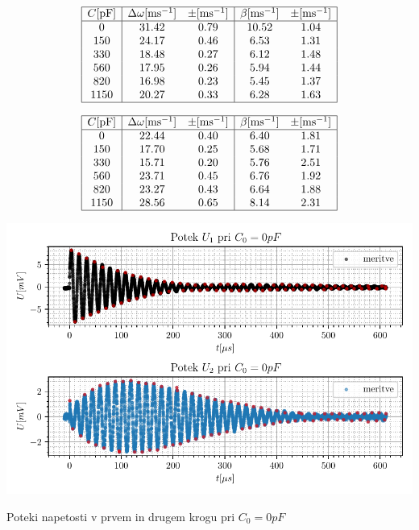 \documentclass[12pt]{report}
\begin{document}
\begin{tabela}
  \centering
  \[
    \begin{array}{|c|c c|c c|}\hline 
      C [\si{pF}] & \Delta \omega [\si{ms^{-1}}] & \pm [\si{ms^{-1}}] & \beta [\si{ms^{-1}}] & \pm [\si{ms^{-1}}]\\ \hline 
      0 & 31.42 &    0.79 &   10.52 &    1.04\\
      150 & 24.17 &    0.46 &    6.53 &    1.31\\
      330 & 18.48 &    0.27 &    6.12 &    1.48\\
      560 & 17.95 &    0.26 &    5.94 &    1.44\\
      820 & 16.98 &    0.23 &    5.45 &    1.37\\
      1150 & 20.27 &    0.33 &    6.28 &    1.63\\ \hline
    \end{array}
  \]
\end{tabela}

\begin{tabela}
  \centering
  \[
    \begin{array}{|c|c c|c c|}\hline 
      C [\si{pF}] & \Delta \omega [\si{ms^{-1}}] & \pm [\si{ms^{-1}}] & \beta [\si{ms^{-1}}] & \pm [\si{ms^{-1}}]\\ \hline 
      0 & 22.44 &    0.40 &    6.40 &    1.81\\
      150 & 17.70 &    0.25 &    5.68 &    1.71\\
      330 & 15.71 &    0.20 &    5.76 &    2.51\\
      560 & 23.71 &    0.45 &    6.76 &    1.92\\
      820 & 23.27 &    0.43 &    6.64 &    1.88\\
      1150 & 28.56 &    0.65 &    8.14 &    2.31\\ \hline
    \end{array}
  \]
\end{tabela}


\begin{slika}[H]
  \centering
  \includegraphics{C0}
  \caption{\small Poteki napetosti v prvem in drugem krogu pri $C_0 = 0\si{pF}$}
\end{slika}
\end{document}
